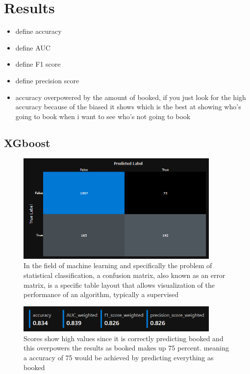 \chapter{Results}
\label{ch:results}

\begin{itemize}
\item define accuracy
\item define AUC
\item define F1 score
\item define precision score
\item accuracy overpowered by the amount of booked, if you just look for the high accuracy because of the biased it shows which is the best at showing who's going to book when i want to see who's not going to book
\end{itemize}


\section{XGboost}



\begin{figure}[hbt!]
 \includegraphics[width=10cm]{figures/azure_ml_confusion_matrix_xg.png}
 \caption{In the field of machine learning and specifically the problem of statistical classification, a confusion matrix, also known as an error matrix, is a specific table layout that allows visualization of the performance of an algorithm, typically a supervised}
\end{figure}

\begin{figure}[hbt!]
 \includegraphics[width=10cm]{figures/xg_boost_scores.png}
 \caption{Scores show high values since it is correctly predicting booked and this overpowers the results as booked makes up 75 percent. meaning a accuracy of 75 would be achieved by predicting everything as booked }
\end{figure}

